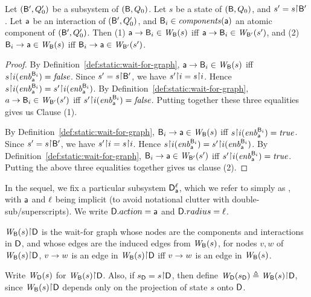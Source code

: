 \begin{proposition} \label{prop:edge-projection}
Let $(\B', Q'_0)$ be a subsystem of
$(\B, Q_0)$. Let $s$ be a state of $(\B, Q_0)$, and $s' = s \pj \B'$.
Let $\act$ be an interaction of $(\B', Q'_0)$, and $\B_i \in \cmps{\act}$ an atomic component of $(\B', Q'_0)$.
Then 
(1) $\act \ar \B_i \in \wfg{\B}{s}$ iff $\act \ar \B_i \in \wfg{\B'}{s'}$, and
(2) $\B_i \ar \act \in \wfg{\B}{s}$ iff $\B_i \ar \act \in \wfg{\B'}{s'}$.
\end{proposition}
%
\begin{proof}
By Definition~\ref{def:static:wait-for-graph}, $\act \ar \B_i \in \wfg{\B}{s}$ iff $s \pj i (\gd{\act}{\B_i}) = \false$.
Since $s' = s \pj \B'$, we have $s' \pj i = s \pj i$. Hence
$s \pj i (\gd{\act}{\B_i}) = s' \pj i (\gd{\act}{\B_i})$.
By Definition~\ref{def:static:wait-for-graph}, 
$a \ar \B_i \in \wfg{\B'}{s'}$ iff $s' \pj i (\gd{\act}{\B_i}) = \false$.
Putting together these three equalities gives us Clause (1).

By Definition~\ref{def:static:wait-for-graph},
$\B_i \ar \act \in \wfg{\B}{s}$ iff 
$s \pj i (\gd{\act}{\B_i}) = \true$.
Since $s' = s \pj \B'$, we have $s' \pj i = s \pj i$. Hence
$s \pj i (\gd{\act}{\B_i}) = s' \pj i (\gd{\act}{\B_i})$.
By Definition~\ref{def:static:wait-for-graph},
$\B_i \ar \act \in \wfg{\B'}{s'}$ iff $s' \pj i (\gd{\act}{\B_i}) = \true$.
Putting the above three equalities together gives us clause (2).
\end{proof}

In the sequel, we fix a particular subsystem $\dsks{\act}{\l}$, which
we refer to simply as \DS, with $\act$ and $\l$ being implicit (to
avoid notational clutter with double-sub/superscripts). 
We write $\DS.action = \act$ and $\DS.radius = \l$. 


\begin{definition} \label{defn:projWgraph}
$\wfg{\B}{s} \pj \DS$ is the wait-for graph whose nodes are the
components and interactions in $\DS$, and whose edges are the induced
edges from $\wfg{\B}{s}$, \ie for nodes $v, w$ of $\wfg{\B}{s} \pj \DS$,
$v \ar w$ is an edge in $\wfg{\B}{s} \pj \DS$ iff $v \ar w$ is an edge in $\wfg{\B}{s}$.

Write $\lwfg{B}{s}{\DS}$ for $\wfg{\B}{s} \pj \DS$.
Also, if $\sD = s \pj \DS$, then define $\lwfg{B}{\sD}{\DS} \df \wfg{\B}{s} \pj \DS$, since $\wfg{\B}{s} \pj \DS$ depends only
on the projection of state $s$ onto $\DS$.
\end{definition}


